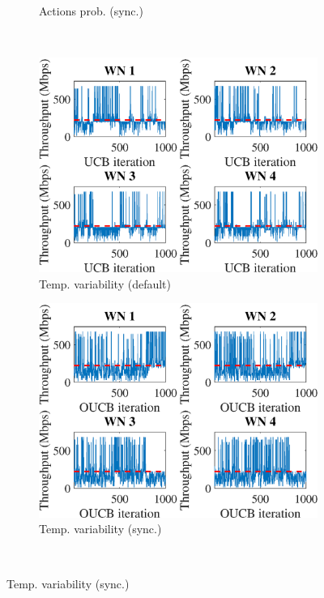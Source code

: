 \documentclass[preprint,12pt]{article}
\begin{document}
\begin{figure}[h!]
\begin{subfigure}[b]{.33\textwidth}
		\caption{Actions prob. (sync.)}\label{fig:actions_probability_OUCB}
	\end{subfigure}\\
	\begin{subfigure}[b]{.33\textwidth}
		\includegraphics[width=\textwidth]{images/temporal_individual_tpt_UCB}
		\caption{Temp. variability  (default)}\label{fig:temporal_individual_tpt_UCB}
	\end{subfigure}
	\begin{subfigure}[b]{.33\textwidth}
		\includegraphics[width=\textwidth]{images/temporal_individual_tpt_OUCB}
		\caption{Temp. variability  (sync.)}\label{fig:temporal_individual_tpt_OUCB}
	\end{subfigure}\\

\end{figure}
\end{document}
